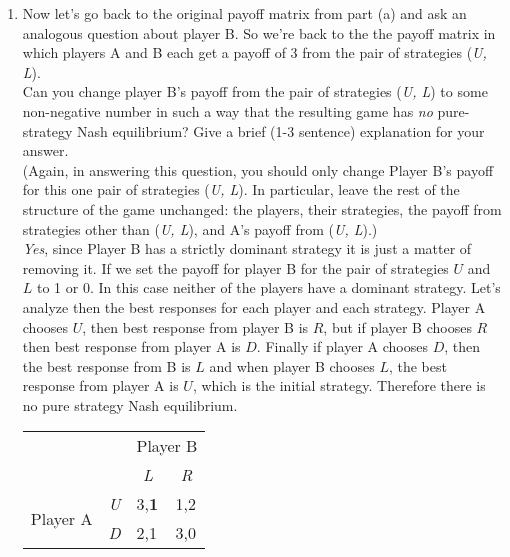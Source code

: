 \documentclass[twoside]{article}
\begin{document}
\begin{enumerate}
\begin{enumerate}
        \item Now let's go back to the original payoff matrix from part (a) and ask an analogous question about player B. So we're back to the the payoff matrix in which players A and B each get a payoff of 3 from the pair of strategies (\textsl{U, L}). \\
        Can you change player B's payoff from the pair of strategies (\textsl{U, L}) to some non-negative number in such a way that the resulting game has \emph{no} pure-strategy Nash equilibrium? Give a brief (1-3 sentence) explanation for your answer. \\
        (Again, in answering this question, you should only change Player B's payoff for this one pair of strategies (\textsl{U, L}). In particular, leave the rest of the structure of the game unchanged: the players, their strategies, the payoff from strategies other than (\textsl{U, L}), and A's payoff from (\textsl{U, L}).) \\
        
        \emph{Yes}, since Player B has a strictly dominant strategy it is just a matter of removing it. If we set the payoff for player B for the pair of strategies $U$ and $L$ to 1 or 0. In this case neither of the players have a dominant strategy. Let's analyze then the best responses for each player and each strategy.
        Player A chooses $U$, then best response from player B is $R$, but if player B chooses $R$ then best response from player A is $D$. Finally if player A chooses $D$, then the best response from B is $L$ and when player B chooses $L$, the best response from player A is $U$, which is the initial strategy. Therefore there is no pure strategy Nash equilibrium.
        
        \begin{center}
            \begin{tabular}{llll}
                                      &                                 & \multicolumn{2}{c}{Player B}                                       \\
                                      &                                 & \multicolumn{1}{c}{\textit{L}}    & \multicolumn{1}{c}{\textit{R}} \\ \cline{3-4} 
            \multirow{2}{*}{Player A} & \multicolumn{1}{l|}{\textit{U}} & \multicolumn{1}{l|}{3,\textbf{1}} & \multicolumn{1}{l|}{1,2}       \\ \cline{3-4} 
                                      & \multicolumn{1}{l|}{\textit{D}} & \multicolumn{1}{l|}{2,1}          & \multicolumn{1}{l|}{3,0}       \\ \cline{3-4} 
            \end{tabular}
        \end{center}
        

\end{enumerate}
\end{enumerate}
\end{document}
